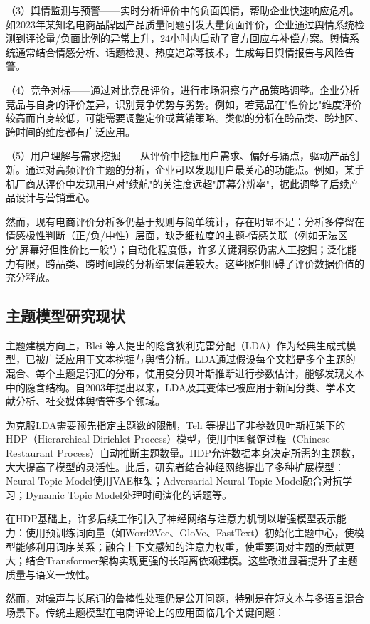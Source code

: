 （3）舆情监测与预警——实时分析评价中的负面舆情，帮助企业快速响应危机。如2023年某知名电商品牌因产品质量问题引发大量负面评价，企业通过舆情系统检测到评论量/负面比例的异常上升，24小时内启动了官方回应与补偿方案。舆情系统通常结合情感分析、话题检测、热度追踪等技术，生成每日舆情报告与风险告警。

（4）竞争对标——通过对比竞品评价，进行市场洞察与产品策略调整。企业分析竞品与自身的评价差异，识别竞争优势与劣势。例如，若竞品在"性价比"维度评价较高而自身较低，可能需要调整定价或营销策略。类似的分析在跨品类、跨地区、跨时间的维度都有广泛应用。

（5）用户理解与需求挖掘——从评价中挖掘用户需求、偏好与痛点，驱动产品创新。通过对高频评价主题的分析，企业可以发现用户最关心的功能点。例如，某手机厂商从评价中发现用户对"续航"的关注度远超"屏幕分辨率"，据此调整了后续产品设计与营销重心。

然而，现有电商评价分析多仍基于规则与简单统计，存在明显不足：分析多停留在情感极性判断（正/负/中性）层面，缺乏细粒度的主题-情感关联（例如无法区分"屏幕好但性价比一般"）；自动化程度低，许多关键洞察仍需人工挖掘；泛化能力有限，跨品类、跨时间段的分析结果偏差较大。这些限制阻碍了评价数据价值的充分释放。

\subsection{主题模型研究现状}

主题建模方向上，Blei 等人提出的隐含狄利克雷分配（LDA）作为经典生成式模型，已被广泛应用于文本挖掘与舆情分析。LDA通过假设每个文档是多个主题的混合、每个主题是词汇的分布，使用变分贝叶斯推断进行参数估计，能够发现文本中的隐含结构。自2003年提出以来，LDA及其变体已被应用于新闻分类、学术文献分析、社交媒体舆情等多个领域。

为克服LDA需要预先指定主题数的限制，Teh 等提出了非参数贝叶斯框架下的HDP（Hierarchical Dirichlet Process）模型，使用中国餐馆过程（Chinese Restaurant Process）自动推断主题数量。HDP允许数据本身决定所需的主题数，大大提高了模型的灵活性。此后，研究者结合神经网络提出了多种扩展模型：Neural Topic Model使用VAE框架；Adversarial-Neural Topic Model融合对抗学习；Dynamic Topic Model处理时间演化的话题等。

在HDP基础上，许多后续工作引入了神经网络与注意力机制以增强模型表示能力：使用预训练词向量（如Word2Vec、GloVe、FastText）初始化主题中心，使模型能够利用词序关系；融合上下文感知的注意力权重，使重要词对主题的贡献更大；结合Transformer架构实现更强的长距离依赖建模。这些改进显著提升了主题质量与语义一致性。

然而，对噪声与长尾词的鲁棒性处理仍是公开问题，特别是在短文本与多语言混合场景下。传统主题模型在电商评论上的应用面临几个关键问题：

